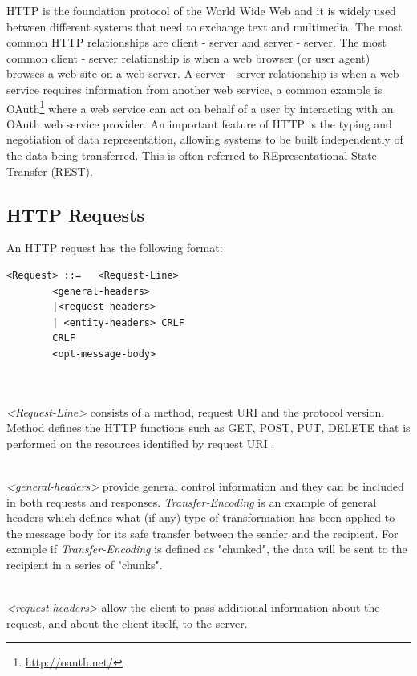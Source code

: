 \documentclass[a4paper,11pt,twoside]{report}
\begin{document}
HTTP is the foundation protocol of the World Wide Web and it is widely used between different systems that need to exchange text and multimedia.  The most common HTTP relationships are client - server and server - server.  The most common client - server relationship is when a web browser (or user agent) browses a web site on a web server.  A server - server relationship is when a web service requires information from another web service, a common example is OAuth\footnote{\label{OAuth} \url{http://oauth.net/}} where a web service can act on behalf of a user by interacting with an OAuth web service provider.  An important feature of HTTP is the typing and negotiation of data representation, allowing systems to be built independently of the data being transferred. This is often referred to REpresentational State Transfer (REST).

\subsection{HTTP Requests} \label{Requests}
An HTTP request has the following format:\bigskip

\begin{lstlisting}[language=terminal, xleftmargin=.3in,xrightmargin=2.5in]
<Request> ::=	<Request-Line>
		<general-headers>
		|<request-headers>
		| <entity-headers> CRLF
		CRLF 
		<opt-message-body>
		
\end{lstlisting} 
\noindent\\
\textit{<Request-Line>} consists of a method, request URI and the protocol version. Method defines the HTTP functions such as GET, POST, PUT, DELETE that is performed on the resources identified by request URI . 

\noindent\\
\textit{<general-headers>} provide general control information and they can be included in both requests and responses. \textit{Transfer-Encoding} is an example of general headers which defines what (if any) type of transformation has been applied to the message body for its safe transfer between the sender and the recipient. For example if \textit{Transfer-Encoding} is defined as "chunked", the data will be sent to the recipient in a series of "chunks". 

\noindent\\
\textit{<request-headers>} allow the client to pass additional information about the request, and about the client itself, to the server. 
\end{document}
